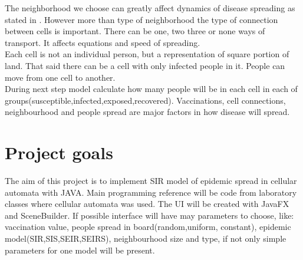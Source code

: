 \documentclass[a4paper, 11pt]{article}
\begin{document}
	The neighborhood we choose can greatly affect dynamics of disease spreading as stated in \cite{cisse}. However more than type of neighborhood the type of connection between cells is important. There can be one, two three or none ways of transport. It affects equations and speed of spreading.\cite{WHITE} \\
	
	Each cell is not an individual person, but a representation of square portion of land. That said there can be a cell with only infected people in it. People can move from one cell to another.\cite{WHITE}  \\
	
	During next step model calculate how many people will be in each cell in each of groups(susceptible,infected,exposed,recovered). Vaccinations, cell connections, neighbourhood and people spread are major factors in how disease will spread.

\section{Project goals}

The aim of this project is to implement SIR model of epidemic spread in cellular automata with JAVA. Main programming reference will be code from laboratory classes where cellular automata was used. The UI will be created with JavaFX and SceneBuilder. If possible interface  will have may parameters to choose, like: vaccination value,  people spread in board(random,uniform, constant), epidemic model(SIR,SIS,SEIR,SEIRS), neighbourhood size and type, if not only simple parameters for one model will be present. 


	
	
\end{document}
